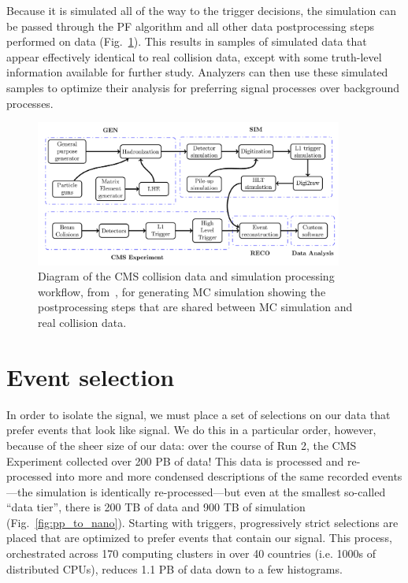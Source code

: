 Because it is simulated all of the way to the trigger decisions, the simulation can be passed through the PF algorithm and all other data postprocessing steps performed on data (Fig.~\ref{fig:mcgen_diagram}). 
This results in samples of simulated data that appear effectively identical to real collision data, except with some truth-level information available for further study. 
Analyzers can then use these simulated samples to optimize their analysis for preferring signal processes over background processes.

\begin{figure}[htb]
    \centering
    \includegraphics[width=0.9\textwidth]{fig/cms/mcgen_diagram.png}
    \caption[Diagram of the CMS collision data and simulation processing workflow]{
        Diagram of the CMS collision data and simulation processing workflow, from~\cite{CMSOpenDataMC}, for generating MC simulation showing the postprocessing steps that are shared between MC simulation and real collision data. 
    }
    \label{fig:mcgen_diagram}
\end{figure}

\section{Event selection}
In order to isolate the signal, we must place a set of selections on our data that prefer events that look like signal. 
We do this in a particular order, however, because of the sheer size of our data: over the course of Run 2, the CMS Experiment collected over 200 PB of data! 
This data is processed and re-processed into more and more condensed descriptions of the same recorded events---the simulation is identically re-processed---but even at the smallest so-called ``data tier'', there is 200 TB of data and 900 TB of simulation (Fig.~\ref{fig:pp_to_nano}). 
Starting with triggers, progressively strict selections are placed that are optimized to prefer events that contain our signal. 
This process, orchestrated across 170 computing clusters in over 40 countries (i.e. 1000s of distributed CPUs), reduces 1.1 PB of data down to a few histograms. %

